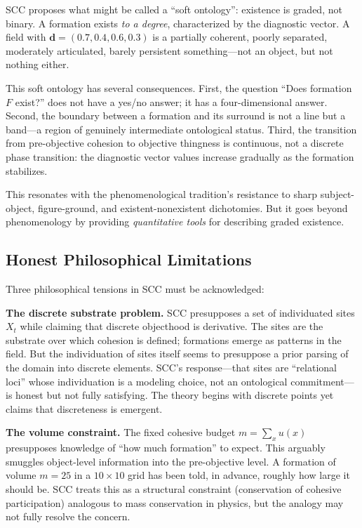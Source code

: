 \documentclass[lettersize,journal]{IEEEtran}
\begin{document}
SCC proposes what might be called a ``soft ontology'': existence is graded, not binary. A formation exists \emph{to a degree}, characterized by the diagnostic vector. A field with $\mathbf{d} = (0.7, 0.4, 0.6, 0.3)$ is a partially coherent, poorly separated, moderately articulated, barely persistent something---not an object, but not nothing either.

This soft ontology has several consequences. First, the question ``Does formation $F$ exist?'' does not have a yes/no answer; it has a four-dimensional answer. Second, the boundary between a formation and its surround is not a line but a band---a region of genuinely intermediate ontological status. Third, the transition from pre-objective cohesion to objective thingness is continuous, not a discrete phase transition: the diagnostic vector values increase gradually as the formation stabilizes.

This resonates with the phenomenological tradition's resistance to sharp subject-object, figure-ground, and existent-nonexistent dichotomies. But it goes beyond phenomenology by providing \emph{quantitative tools} for describing graded existence.

\subsection{Honest Philosophical Limitations}

Three philosophical tensions in SCC must be acknowledged:

\textbf{The discrete substrate problem.} SCC presupposes a set of individuated sites $X_t$ while claiming that discrete objecthood is derivative. The sites are the substrate over which cohesion is defined; formations emerge as patterns in the field. But the individuation of sites itself seems to presuppose a prior parsing of the domain into discrete elements. SCC's response---that sites are ``relational loci'' whose individuation is a modeling choice, not an ontological commitment---is honest but not fully satisfying. The theory begins with discrete points yet claims that discreteness is emergent.

\textbf{The volume constraint.} The fixed cohesive budget $m = \sum_x u(x)$ presupposes knowledge of ``how much formation'' to expect. This arguably smuggles object-level information into the pre-objective level. A formation of volume $m = 25$ in a $10 \times 10$ grid has been told, in advance, roughly how large it should be. SCC treats this as a structural constraint (conservation of cohesive participation) analogous to mass conservation in physics, but the analogy may not fully resolve the concern.
\end{document}

